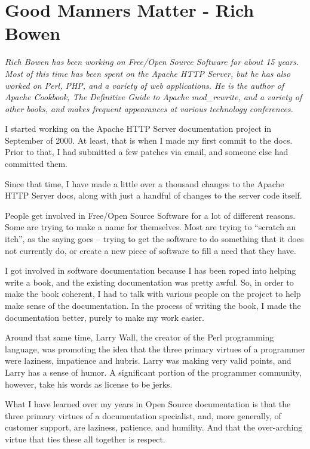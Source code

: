 \chapter{Good Manners Matter - Rich Bowen}

\textit{Rich Bowen has been working on Free/Open Source Software for about 15 years.
Most of this time has been spent on the Apache HTTP Server, but he has also
worked on Perl, PHP, and a variety of web applications. He is the author of
Apache Cookbook, The Definitive Guide to Apache mod\_rewrite, and a variety of
other books, and makes frequent appearances at various technology conferences.}

I started working on the Apache HTTP Server documentation project in September
of 2000. At least, that is when I made my first commit to the docs. Prior to
that, I had submitted a few patches via email, and someone else had committed
them.

Since that time, I have made a little over a thousand changes to the Apache HTTP
Server docs, along with just a handful of changes to the server code itself.

People get involved in Free/Open Source Software for a lot of different reasons.
Some are trying to make a name for themselves. Most are trying to ``scratch an
itch'', as the saying goes -- trying to get the software to do something that it
does not currently do, or create a new piece of software to fill a need that
they have.

I got involved in software documentation because I has been roped into helping
write a book, and the existing documentation was pretty awful. So, in order to
make the book coherent, I had to talk with various people on the project to help
make sense of the documentation. In the process of writing the book, I made the
documentation better, purely to make my work easier.

Around that same time, Larry Wall, the creator of the Perl programming language,
was promoting the idea that the three primary virtues of a programmer were
laziness, impatience and hubris. Larry was making very valid points, and Larry
has a sense of humor. A significant portion of the programmer community,
however, take his words as license to be jerks.

What I have learned over my years in Open Source documentation is that the three
primary virtues of a documentation specialist, and, more generally, of customer
support, are laziness, patience, and humility. And that the over-arching virtue
that ties these all together is respect.

